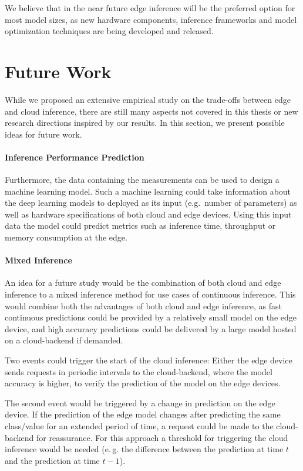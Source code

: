 


We believe that in the near future edge inference will be the preferred option for most model sizes, as new hardware components, inference frameworks and model optimization techniques are being developed and released.


\section{Future Work}
While we proposed an extensive empirical study on the trade-offs between edge and cloud inference, there are still many aspects not covered in this thesis or new research directions inspired by our results. 
In this section, we present possible ideas for future work.
\paragraph{Inference Performance Prediction}
Furthermore, the data containing the measurements can be used to design a machine learning model.
Such a machine learning could take information about the deep learning models to deployed as its input (e.g.\, number of parameters) as well as hardware specifications of both cloud and edge devices.
Using this input data the model could predict metrics such as inference time, throughput or memory consumption at the edge.
\paragraph{Mixed Inference}
An idea for a future study would be the combination of both cloud and edge inference to a mixed inference method for use cases of continuous inference.
This would combine both the advantages of both cloud and edge inference, as fast continuous predictions could be provided by a relatively small model on the edge device, and high accuracy predictions could be delivered by a large model hosted on a cloud-backend if demanded. 

Two events could trigger the start of the cloud inference: 
Either the edge device sends requests in periodic intervals to the cloud-backend, where the model accuracy is higher, to verify the prediction of the model on the edge devices.

The second event would be triggered by a change in prediction on the edge device. If the prediction of the edge model changes after predicting the same class/value for an extended period of time, a request could be made to the cloud-backend for reassurance. For this approach a threshold for triggering the cloud inference would be needed (e.\,g. the difference between the prediction at time $t$ and the prediction at time $t-1$).



